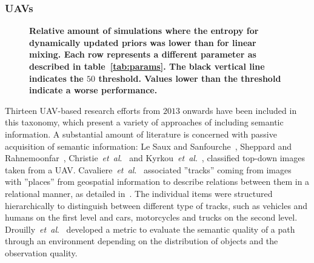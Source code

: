 \documentclass[twocolumn,letterpaper]{IEEEAerospaceCLS}  %
\newcommand{\abbreviation}[1]{\emph{#1}.}
\newcommand{\etal}{\abbreviation{et~al}}
\begin{document}
\subsubsection{UAVs} \label{sssec:ResLitUAV}
\begin{figure}[t]
    \centering
    \caption{\bf{
        Relative amount of simulations where the entropy for dynamically updated priors was lower than for linear mixing. Each row represents a different parameter as described in table~\ref{tab:params}. The black vertical line indicates the $50$ threshold. Values lower than the threshold indicate a worse performance.
    }}
    \label{fig:Res}
\end{figure}
Thirteen UAV-based research efforts from $2013$ onwards have been included in this taxonomy, which present a variety of approaches of including semantic information. A substantial amount of literature is concerned with passive acquisition of semantic information: 
Le Saux and Sanfourche~\cite{saux_rapid_2013}, Sheppard and Rahnemoonfar~\cite{sheppard_real-time_2017}, Christie~\etal~\cite{christie_semantics_2016} and Kyrkou~\etal~\cite{kyrkou_dronet:_2018}, classified top-down images taken from a UAV. Cavaliere~\etal~\cite{cavaliere_towards_2016,cavaliere_towards_2018} associated ''tracks'' coming from images with ''places'' from geospatial information to describe relations between them in a relational manner, as detailed in~\cite{landsiedel_review_2017}. The individual items were structured hierarchically to distinguish between different type of tracks, such as vehicles and humans on the first level and cars, motorcycles and trucks on the second level. Drouilly~\etal~\cite{drouilly_semantic_2015} developed a metric to evaluate the semantic quality of a path through an environment depending on the distribution of objects and the observation quality.
\end{document}
